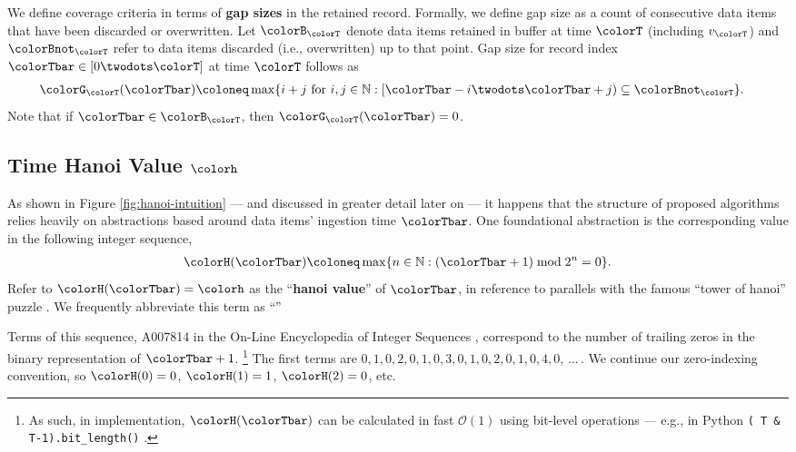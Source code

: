 We define coverage criteria in terms of \textbf{gap sizes} in the retained record.
Formally, we define gap size as a count of consecutive data items that have been discarded or overwritten.
Let $\colorB_{\colorT}$ denote data items retained in buffer at time $\colorT$ (including $v_{\colorT}$) and $\colorBnot_{\colorT}$ refer to data items discarded (i.e., overwritten) up to that point.
Gap size for record index $\colorTbar \in [0 \twodots \colorT]$ at time $\colorT$ follows as
\begin{align}
\colorG_{\colorT}(\colorTbar)
&\coloneq
\max
\{
  i + j
  \text{ for }
  i, j \in \mathbb{N}
  :
  [\colorTbar-i \twodots \colorTbar+j) \subseteq \colorBnot_{\colorT}
\}.
\label{eqn:gap-size-defn}
\end{align}
Note that if $\colorTbar \in \colorB_{\colorT}$, then $\colorG_{\colorT}(\colorTbar) = 0$.

\subsection{Time Hanoi Value $\colorh$}
\label{sec:notation-hanoi}

As shown in Figure \ref{fig:hanoi-intuition} --- and discussed in greater detail later on --- it happens that the structure of proposed algorithms relies heavily on abstractions based around data items' ingestion time $\colorTbar$.
One foundational abstraction is the corresponding value in the following integer sequence,
\begin{align}
\colorH(\colorTbar)
\coloneq
\max \{ n \in \mathbb{N} : (\colorTbar + 1) \bmod 2^n = 0 \}.
\label{eqn:hanoi-defn}
\end{align}
Refer to $\colorH(\colorTbar) = \colorh$ as the ``\textbf{hanoi value}'' of $\colorTbar$, in reference to parallels with the famous ``tower of hanoi'' puzzle \citep{lucas1889jeux}.
We frequently abbreviate this term as ``\textbf{\hv{}}''

Terms of this sequence, A007814 in the On-Line Encyclopedia of Integer Sequences \citep{oeis}, correspond to the number of trailing zeros in the binary representation of $\colorTbar + 1$.%
\footnote{%
As such, in implementation, $\colorH(\colorTbar)$ can be calculated in fast $\mathcal{O}(1)$ using bit-level operations --- e.g., in Python \texttt{(~T \& T-1).bit\_length()} \citep{oeis}.
}
The first terms are $0,\allowbreak 1,\allowbreak 0,\allowbreak 2,\allowbreak 0,\allowbreak 1,\allowbreak 0,\allowbreak 3,\allowbreak 0,\allowbreak 1,\allowbreak 0,\allowbreak 2,\allowbreak 0,\allowbreak 1,\allowbreak 0,\allowbreak 4,\allowbreak 0,\allowbreak \,\ldots \,$.
We continue our zero-indexing convention, so $\colorH(0) = 0$, $\colorH(1) = 1$, $\colorH(2) = 0$, etc.

